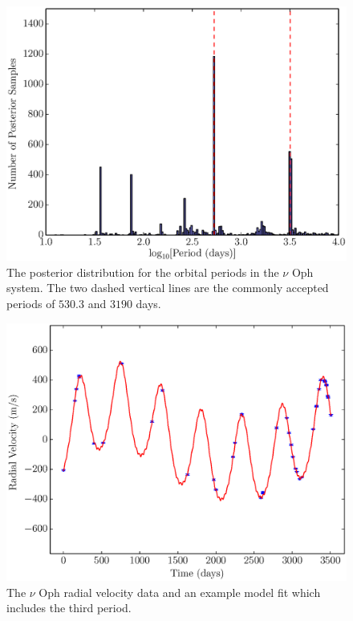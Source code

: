 \documentclass[useAMS,usenatbib]{mn2e}
\begin{document}
\begin{figure}
\includegraphics[scale=0.45]{Figures/nu_oph_periods.eps}
\caption{The posterior distribution for the orbital periods in the $\nu$ Oph
system. The two dashed vertical lines are the commonly accepted periods
of $530.3$ and $3190$ days.\label{fig:nu_oph_periods}}
\end{figure}

\begin{figure}
\includegraphics[scale=0.45]{Figures/nuoph.eps}
\caption{The $\nu$ Oph radial velocity data and an example model fit which
includes the third period.\label{fig:nuoph}}
\end{figure}
\end{document}
